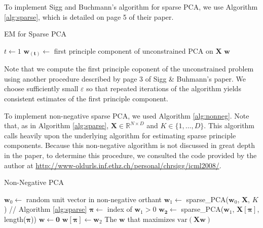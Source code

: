 \documentclass{article}
\begin{document}
To implement Sigg and Buchmann's algorithm for sparse PCA,
we use Algorithm \ref{alg:sparse}, which is detailed on
page 5 of their paper.

\begin{algorithm}[H]\dontprintsemicolon
  \caption{EM for Sparse PCA}
  \label{alg:sparse}
  $t \leftarrow 1$ \;
  $\mathbf{w_{(t)}} \leftarrow$ first principle component
  of unconstrained PCA on $\mathbf{X}$ \;
  \Return $\mathbf{w}$
\end{algorithm}

Note that we compute the first principle coponent of the
unconstrained problem using another procedure described by
page 3 of Sigg \& Buhmann's paper.
We choose sufficiently small $\varepsilon$ so that repeated
iterations of the algorithm yields consistent estimates of
the first principle component.

To implement non-negative sparse PCA, we used Algorithm \ref{alg:nonneg}.
Note that, as in Algorithm \ref{alg:sparse},
$\mathbf{X} \in \mathds{R}^{ N\times D}$ and $K \in \{1, \ldots, D\}$.
This algorithm calls heavily upon the underlying algorithm for
estimating sparse principle components.
Because this non-negative algorithm is not discussed in great depth
in the paper, to determine this procedure, we consulted the code
provided by the author at
\url{http://www-oldurls.inf.ethz.ch/personal/chrsigg/icml2008/}.

\begin{algorithm}[H]\dontprintsemicolon
  \caption{Non-Negative PCA}
  \label{alg:nonneg}
   {
    $\mathbf{w}_0 \leftarrow$ random unit vector in non-negative orthant \;
    $\mathbf{w}_1 \leftarrow$ sparse\_PCA($\mathbf{w}_0$, $\mathbf{X}$, $K$)
      // Algorithm \ref{alg:sparse} \;
    $\boldsymbol\pi \leftarrow$ index of $\mathbf{w}_1 > 0$ \;
    $\mathbf{w_2} \leftarrow$ sparse\_PCA($\mathbf{w}_1$,
    $\mathbf{X}[\boldsymbol\pi]$, length($\boldsymbol\pi$)) \;
    $\mathbf{w} \leftarrow \mathbf{0}$ \;
    $\mathbf{w}[\boldsymbol\pi] \leftarrow \mathbf{w}_2$
  }
  \Return The $\mathbf{w}$ that maximizes $\textrm{var}(\mathbf{Xw})$
\end{algorithm}
\end{document}
